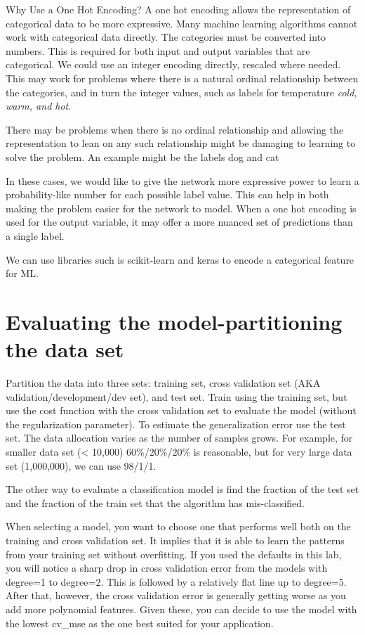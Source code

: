 \documentclass[12pt]{report}
\begin{document}
Why Use a One Hot Encoding?
A one hot encoding allows the representation of categorical data to be more expressive. Many machine learning algorithms cannot work with categorical data directly. The categories must be converted into numbers. This is required for both input and output variables that are categorical. We could use an integer encoding directly, rescaled where needed. This may work for problems where there is a natural ordinal relationship between the categories, and in turn the integer values, such as labels for temperature \textit{cold, warm, and hot}.

There may be problems when there is no ordinal relationship and allowing the representation to lean on any such relationship might be damaging to learning to solve the problem. An example might be the labels dog and cat

In these cases, we would like to give the network more expressive power to learn a probability-like number for each possible label value. This can help in both making the problem easier for the network to model. When a one hot encoding is used for the output variable, it may offer a more nuanced set of predictions than a single label.

We can use libraries such is scikit-learn and keras to encode a categorical feature for ML.

\section{Evaluating the model-partitioning the data set}
\label{sec:dist}

Partition the data into three sets: training set, cross validation set (AKA validation/development/dev set), and test set. Train using the training set, but use the cost function with the cross validation set to evaluate the model (without the regularization parameter). To estimate the generalization error use the test set. The data allocation varies as the number of samples grows. For example, for smaller data set (< 10,000) 60\%/20\%/20\% is reasonable, but for very large data set (1,000,000), we can use 98/1/1.

The other way to evaluate a classification model is find the fraction of the test set and the fraction of the train set that the algorithm has mis-classified.

When selecting a model, you want to choose one that performs well both on the training and cross validation set. It implies that it is able to learn the patterns from your training set without overfitting. If you used the defaults in this lab, you will notice a sharp drop in cross validation error from the models with degree=1 to degree=2. This is followed by a relatively flat line up to degree=5. After that, however, the cross validation error is generally getting worse as you add more polynomial features. Given these, you can decide to use the model with the lowest cv\_mse as the one best suited for your application.
\end{document}
